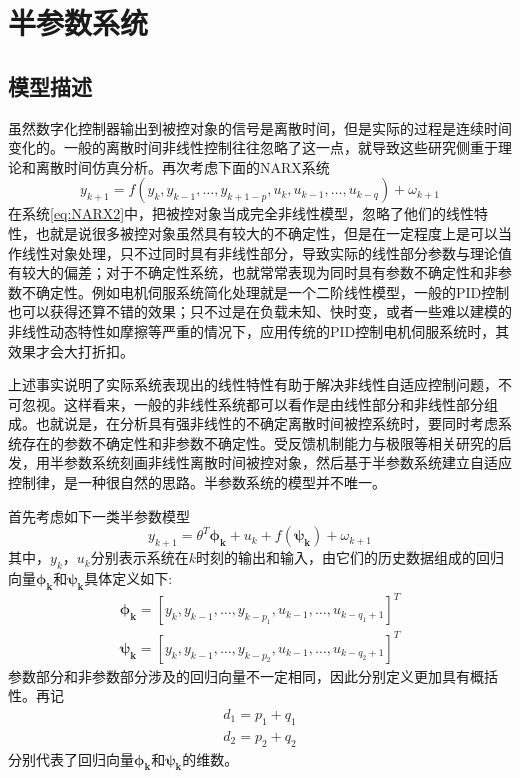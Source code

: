 \section{半参数系统}\label{sect:2.2}
\subsection{模型描述}\label{subsect:2.2.1}
虽然数字化控制器输出到被控对象的信号是离散时间，但是实际的过程是连续时间变化的。一般的离散时间非线性控制往往忽略了这一点，就导致这些研究侧重于理论和离散时间仿真分析。再次考虑下面的NARX系统
\begin{equation}%
\label{eq:NARX2}
y_{k+1} = f(y_{k},y_{k-1},\ldots,y_{k+1-p},u_{k},u_{k-1},\ldots,u_{k-q})+\omega_{k+1}
\end{equation}
在系统\eqref{eq:NARX2}中，把被控对象当成完全非线性模型，忽略了他们的线性特性，也就是说很多被控对象虽然具有较大的不确定性，但是在一定程度上是可以当作线性对象处理，只不过同时具有非线性部分，导致实际的线性部分参数与理论值有较大的偏差；对于不确定性系统，也就常常表现为同时具有参数不确定性和非参数不确定性。例如电机伺服系统简化处理就是一个二阶线性模型，一般的PID控制也可以获得还算不错的效果；只不过是在负载未知、快时变，或者一些难以建模的非线性动态特性如摩擦等严重的情况下，应用传统的PID控制电机伺服系统时，其效果才会大打折扣。

上述事实说明了实际系统表现出的线性特性有助于解决非线性自适应控制问题，不可忽视。这样看来，一般的非线性系统都可以看作是由线性部分和非线性部分组成。也就说是，在分析具有强非线性的不确定离散时间被控系统时，要同时考虑系统存在的参数不确定性和非参数不确定性。受反馈机制能力与极限等相关研究的启发，用半参数系统刻画非线性离散时间被控对象，然后基于半参数系统建立自适应控制律，是一种很自然的思路。半参数系统的模型并不唯一。

首先考虑如下一类半参数模型
\begin{equation}%
\label{eq:semi-u}
y_{k+1} = \theta^{T}\bm{\phi_{k}}+u_{k}+f(\bm{\psi_{k}})+\omega_{k+1}
\end{equation}
其中，$y_{k}$，$u_{k}$分别表示系统在$k$时刻的输出和输入，由它们的历史数据组成的回归向量$\bm{\phi_{k}}$和$\bm{\psi_{k}}$具体定义如下:
\begin{eqnarray}
\bm{\phi_{k}}=[y_{k},y_{k-1},\ldots,y_{k-p_{1}},u_{k-1},\dots,u_{k-q_{1}+1}]^{T}\\
\bm{\psi_{k}}=[y_{k},y_{k-1},\ldots,y_{k-p_{2}},u_{k-1},\dots,u_{k-q_{2}+1}]^{T}
\end{eqnarray}
参数部分和非参数部分涉及的回归向量不一定相同，因此分别定义更加具有概括性。再记
\begin{eqnarray}
d_{1}=p_{1}+q_{1}\\
d_{2}=p_{2}+q_{2}
\end{eqnarray}
分别代表了回归向量$\bm{\phi_{k}}$和$\bm{\psi_{k}}$的维数。

